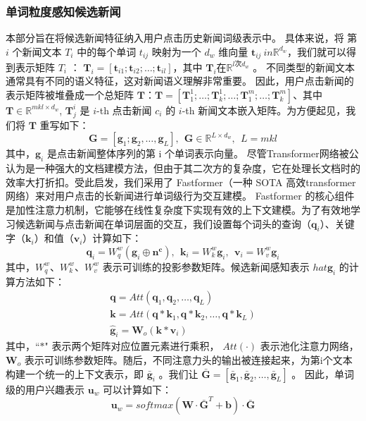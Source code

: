 \documentclass[withoutpreface,bwprint]{cumcmthesis} %
\begin{document}
	\subsubsection{ 单词粒度感知候选新闻}
	本部分旨在将候选新闻特征纳入用户点击历史新闻词级表示中。
	具体来说，将 第$i$ 个新闻文本 $T_i$ 中的每个单词 $t_{ij}$ 映射为一个 $d_w$ 维向量 $\mathbf{t}_{ij}\ in \mathbb{R}^{d_w}$，我们就可以得到表示矩阵  $T_i$ ： $\mathbf{T}_i = [\mathbf{t}_{i1}; \mathbf{t}_{i2}; \dots; \mathbf{t}_{il}]$，其中 $\mathbf{T}_i 在 \mathbb{R}^{l 次 d_w}$ 。
	不同类型的新闻文本通常具有不同的语义特征，这对新闻语义理解非常重要。 因此，用户点击新闻的表示矩阵被堆叠成一个总矩阵 $\mathbf{T}$：$\mathbf{T} =[\mathbf{T} _1^1;\ldots;\mathbf{T} _k^1;\ldots;\mathbf{T} _1^m;\ldots;\mathbf{T} _k^m]$、其中 $\mathbf{T} \in \mathbb{R}^{mkl \times d_w}$, $\mathbf{T}_j^i$ 是 $i$-th 点击新闻 $c_i$ 的 $i$-th 新闻文本嵌入矩阵。为方便起见，我们将 $\mathbf{T}$ 重写如下：
	\begin{equation}
	\mathbf{G} = [\mathbf{g}_1; \mathbf{g}_2, \dots, \mathbf{g}_L],~~ \mathbf{G} \in \mathbb{R}^{L\times d_w},~~L = mkl
	\end{equation}
	其中，$\mathbf{g}_i$ 是点击新闻整体序列的第 i 个单词表示向量。
	尽管Transformer网络被公认为是一种强大的文档建模方法，但由于其二次方的复杂度，它在处理长文档时的效率大打折扣。受此启发，我们采用了 Fastformer（一种 SOTA 高效transformer网络）来对用户点击的长新闻进行单词级行为交互建模。 Fastformer 的核心组件是加性注意力机制，它能够在线性复杂度下实现有效的上下文建模。为了有效地学习候选新闻与点击新闻在单词层面的交互，我们设置每个词头的查询（$\mathbf{q}_i$）、关键字（$\mathbf{k}_i$）和值（$\mathbf{v}_i$）计算如下：	
	\begin{equation}
	\mathbf{q}_i = W^w_q(\mathbf{g}_i \oplus \mathbf{n^c}),~~
	\mathbf{k}_i = W^w_k\mathbf{g}_i,~~
	\mathbf{v}_i = W^w_v\mathbf{g}_i
	\end{equation}
	其中，$W^w_q$、$W^w_k$、$W^w_v$ 表示可训练的投影参数矩阵。候选新闻感知表示 $hat{\mathbf{g}}_i$ 的计算方法如下：
	\begin{equation}\label{wcan}
	\begin{split}
	\mathbf{q} = Att(\mathbf{q}_1, \mathbf{q}_2, \dots, \mathbf{q}_L)\\
	\mathbf{k} = Att(\mathbf{q} * \mathbf{k}_1, \mathbf{q} * \mathbf{k}_2, \dots, \mathbf{q} * \mathbf{k}_L)\\
	\hat{\mathbf{g}}_i = \mathbf{W}_o(\mathbf{k} * \mathbf{v}_i)
	\end{split}
	\end{equation}
	其中，``$*$" 表示两个矩阵对应位置元素进行乘积， $Att(\cdot)$ 表示池化注意力网络，$\mathbf{W}_o$ 表示可训练参数矩阵。随后，不同注意力头的输出被连接起来，为第i个文本构建一个统一的上下文表示，即 $\bar{\mathbf{g}}_i$ 。我们让  $\bar{\mathbf{G}}= [\bar{\mathbf{g}}_1,\bar{\mathbf{g}}_2, \ldots,  \bar{\mathbf{g}} _L]$ 。
	 因此，单词级的用户兴趣表示 $\mathbf{u}_w$ 可以计算如下：
	\begin{equation}
	\mathbf{u} _w = softmax( \mathbf{W} \cdot \mathbf{\bar{G}}^{T} + \mathbf{b}) \cdot \mathbf{\bar{G}}
	\end{equation}
\end{document}
